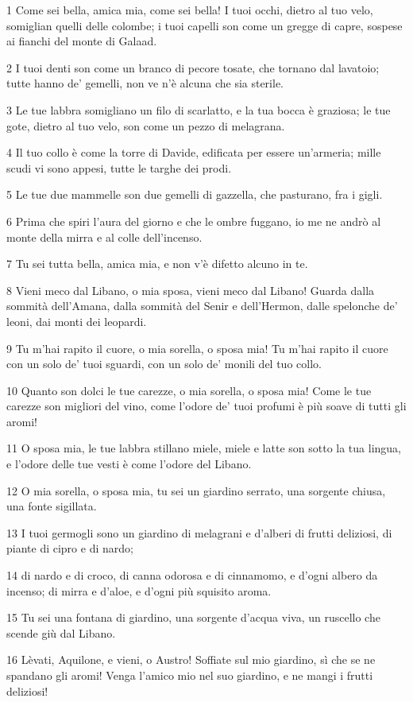 \par 1 Come sei bella, amica mia, come sei bella! I tuoi occhi, dietro al tuo velo, somiglian quelli delle colombe; i tuoi capelli son come un gregge di capre, sospese ai fianchi del monte di Galaad.
\par 2 I tuoi denti son come un branco di pecore tosate, che tornano dal lavatoio; tutte hanno de' gemelli, non ve n'è alcuna che sia sterile.
\par 3 Le tue labbra somigliano un filo di scarlatto, e la tua bocca è graziosa; le tue gote, dietro al tuo velo, son come un pezzo di melagrana.
\par 4 Il tuo collo è come la torre di Davide, edificata per essere un'armeria; mille scudi vi sono appesi, tutte le targhe dei prodi.
\par 5 Le tue due mammelle son due gemelli di gazzella, che pasturano, fra i gigli.
\par 6 Prima che spiri l'aura del giorno e che le ombre fuggano, io me ne andrò al monte della mirra e al colle dell'incenso.
\par 7 Tu sei tutta bella, amica mia, e non v'è difetto alcuno in te.
\par 8 Vieni meco dal Libano, o mia sposa, vieni meco dal Libano! Guarda dalla sommità dell'Amana, dalla sommità del Senir e dell'Hermon, dalle spelonche de' leoni, dai monti dei leopardi.
\par 9 Tu m'hai rapito il cuore, o mia sorella, o sposa mia! Tu m'hai rapito il cuore con un solo de' tuoi sguardi, con un solo de' monili del tuo collo.
\par 10 Quanto son dolci le tue carezze, o mia sorella, o sposa mia! Come le tue carezze son migliori del vino, come l'odore de' tuoi profumi è più soave di tutti gli aromi!
\par 11 O sposa mia, le tue labbra stillano miele, miele e latte son sotto la tua lingua, e l'odore delle tue vesti è come l'odore del Libano.
\par 12 O mia sorella, o sposa mia, tu sei un giardino serrato, una sorgente chiusa, una fonte sigillata.
\par 13 I tuoi germogli sono un giardino di melagrani e d'alberi di frutti deliziosi, di piante di cipro e di nardo;
\par 14 di nardo e di croco, di canna odorosa e di cinnamomo, e d'ogni albero da incenso; di mirra e d'aloe, e d'ogni più squisito aroma.
\par 15 Tu sei una fontana di giardino, una sorgente d'acqua viva, un ruscello che scende giù dal Libano.
\par 16 Lèvati, Aquilone, e vieni, o Austro! Soffiate sul mio giardino, sì che se ne spandano gli aromi! Venga l'amico mio nel suo giardino, e ne mangi i frutti deliziosi!

